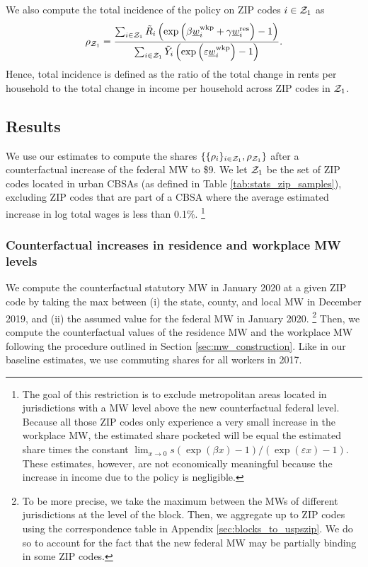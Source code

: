 We also compute the total incidence of the policy on ZIP codes $i\in\mathcal{Z}_1$ as
\begin{equation}\label{eq:tot_incidence}
    \rho_{\mathcal{Z}_1} = 
        \frac{\sum_{i\in\mathcal{Z}_1} \tilde R_i \left(\exp \left( \beta \underline{w}_i^{\text{wkp}} 
                                    + \gamma \underline{w}_i^{\text{res}} \right) - 1\right) }
            {\sum_{i\in\mathcal{Z}_1} \tilde Y_i \left( \exp \left( \varepsilon \underline{w}_i^{\text{wkp}} \right) 
                                    - 1\right) } .
\end{equation}
Hence, total incidence is defined as the ratio of the total change in rents
per household to the total change in income per household across ZIP codes 
in $\mathcal{Z}_1$.

\subsection{Results}\label{sec:results_cf}

We use our estimates to compute the shares 
$\{\{\rho_i\}_{i\in\mathcal{Z}_1},\rho_{\mathcal{Z}_1}\}$ after a counterfactual 
increase of the federal MW to \$9.
We let $\mathcal{Z}_1$ be the set of ZIP codes located in urban CBSAs (as defined in
Table \ref{tab:stats_zip_samples}), excluding ZIP codes that are part of a CBSA 
where the average estimated increase in log total wages is less than 0.1\%.%
\footnote{\label{foot:restriction_on_zipcodes}
The goal of this restriction is to exclude metropolitan areas located 
in jurisdictions with a MW level above the new counterfactual federal level.
Because all those ZIP codes only experience a very small increase in the 
workplace MW, the estimated share pocketed will be equal the estimated
share times the constant 
$\lim_{x\to 0} s \left(\exp(\beta x)-1\right)/\left(\exp(\varepsilon x)-1\right)$.
These estimates, however, are not economically meaningful because the increase
in income due to the policy is negligible.}

\subsubsection*{Counterfactual increases in residence and workplace MW levels}
\label{sec:cf_res_and_wkp_changes}

We compute the counterfactual statutory MW in January 2020 at a given ZIP code 
by taking the max between (i) the state, county, and local MW in December 2019, 
and (ii) the assumed value for the federal MW in January 2020.%
\footnote{To be more precise, we take the maximum between the MWs of different
jurisdictions at the level of the block.
Then, we aggregate up to ZIP codes using the correspondence table in Appendix 
\ref{sec:blocks_to_uspszip}.
We do so to account for the fact that the new federal MW may be partially 
binding in some ZIP codes.}
Then, we compute the counterfactual values of the residence MW and the workplace
MW following the procedure outlined in Section \ref{sec:mw_construction}.
Like in our baseline estimates, we use commuting shares for all workers in
2017.

